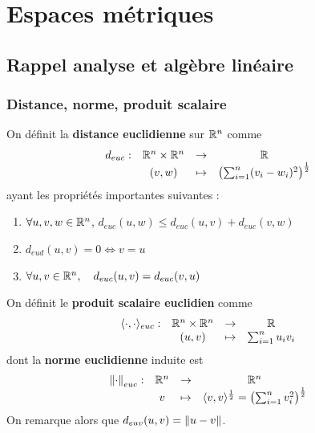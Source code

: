 \chapter{Espaces métriques}

\section{Rappel analyse et algèbre linéaire}
\subsection{Distance, norme, produit scalaire}
\begin{definition} \label{def: Distance euclidienne}
	On définit la \textbf{distance euclidienne} sur $\mathbb{R}^n$ comme
	\[
	\begin{array}{cccc}
		d_{euc} : & \mathbb{R}^n \times \mathbb{R}^n & \to & \mathbb{R} \\
					& (v, w) & \mapsto & \left( \sum_{i=1}^n (v_i - w_i)^2 \right)^\frac12
	\end{array}
	\]
	ayant les propriétés importantes suivantes :
	\begin{enumerate}
		\item $\forall u,v,w \in \mathbb{R}^n$, $d_{euc}(u,w) \leqslant d_{euc}(u,v) + d_{euc}(v,w)$
		
		\item $d_{eud}(u,v) = 0 \iff v = u$
		
		\item $\forall u,v \in \mathbb{R}^n, \quad d_{euc}(u,v) = d_{euc}(v,u)$
	\end{enumerate}
\end{definition}

\begin{definition} \label{def: Produit scalaire et norme euclidienne}
	On définit le \textbf{produit scalaire euclidien} comme
	\[
	\begin{array}{cccc}
		\langle \cdot, \cdot \rangle_{euc} : & \mathbb{R}^n \times \mathbb{R}^n& \to & \mathbb{R} \\
												& (u,v) & \mapsto & \sum_{i=1}^n u_i v_i 
	\end{array}
	\]
	dont la \textbf{norme euclidienne} induite est
	\[
	\begin{array}{cccc}
		\left\| \cdot \right\|_{euc} : & \mathbb{R}^n & \to & \mathbb{R}^n \\
								& v & \mapsto & \langle v,v \rangle^\frac12 = \left(\sum_{i=1}^n v_i^2 \right)^\frac12
	\end{array}
	\]
	On remarque alors que $d_{euv}(u,v) = \left\| u -v \right\|$.
\end{definition}

